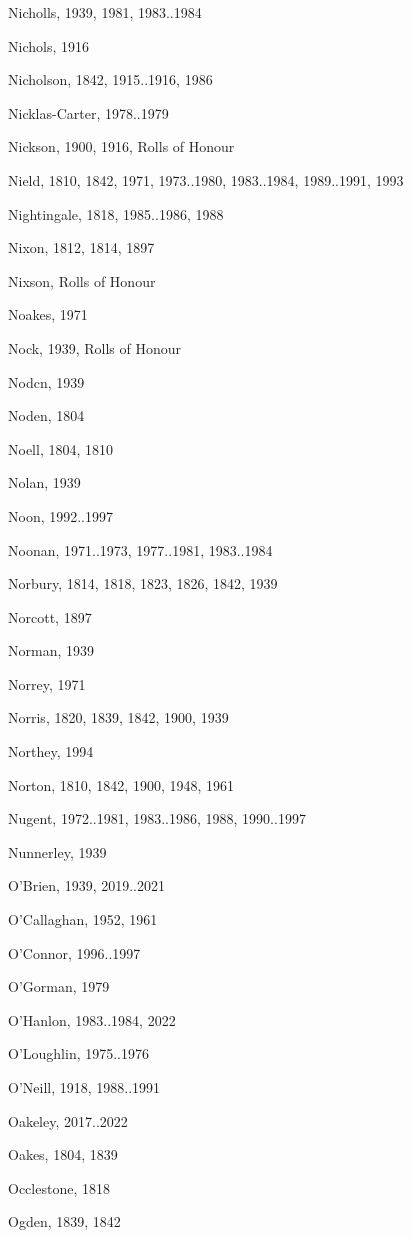 \begin{theindex}
\item Nicholls, 1939, 1981, 1983..1984
\item Nichols, 1916
\item Nicholson, 1842, 1915..1916, 1986
\item Nicklas-Carter, 1978..1979
\item Nickson, 1900, 1916, Rolls of Honour
\item Nield, 1810, 1842, 1971, 1973..1980, 1983..1984, 1989..1991, 1993
\item Nightingale, 1818, 1985..1986, 1988
\item Nixon, 1812, 1814, 1897
\item Nixson, Rolls of Honour
\item Noakes, 1971
\item Nock, 1939, Rolls of Honour
\item Nodcn, 1939
\item Noden, 1804
\item Noell, 1804, 1810
\item Nolan, 1939
\item Noon, 1992..1997
\item Noonan, 1971..1973, 1977..1981, 1983..1984
\item Norbury, 1814, 1818, 1823, 1826, 1842, 1939
\item Norcott, 1897
\item Norman, 1939
\item Norrey, 1971
\item Norris, 1820, 1839, 1842, 1900, 1939
\item Northey, 1994
\item Norton, 1810, 1842, 1900, 1948, 1961
\item Nugent, 1972..1981, 1983..1986, 1988, 1990..1997
\item Nunnerley, 1939
\item O'Brien, 1939, 2019..2021
\item O'Callaghan, 1952, 1961
\item O'Connor, 1996..1997
\item O'Gorman, 1979
\item O'Hanlon, 1983..1984, 2022
\item O'Loughlin, 1975..1976
\item O'Neill, 1918, 1988..1991
\item Oakeley, 2017..2022
\item Oakes, 1804, 1839
\item Occlestone, 1818
\item Ogden, 1839, 1842

\end{theindex}
